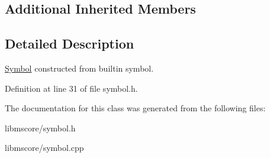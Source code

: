 \subsection*{Additional Inherited Members}


\subsection{Detailed Description}
\hyperlink{class_ms_1_1_symbol}{Symbol} constructed from builtin symbol. 

Definition at line 31 of file symbol.\+h.



The documentation for this class was generated from the following files\+:\begin{DoxyCompactItemize}
\item 
libmscore/symbol.\+h\item 
libmscore/symbol.\+cpp\end{DoxyCompactItemize}
